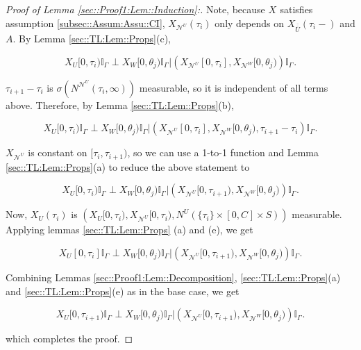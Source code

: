 \documentclass[12pt]{article}
\newcommand{\mb}{\mathbb}
\newcommand{\mc}{\mathcal}
\newcommand{\ov}{\overline}
\renewcommand{\U}{U}							%
\newcommand{\UU}{W}								%
\renewcommand{\S}{S}							%
\newcommand{\X}{X}								%
\newcommand{\neigh}{\mc{N}}						%
\newcommand{\vind}[1]{^{#1}}					%
\newcommand{\cind}[1]{_{#1}}					%
\newcommand{\cl}{\ov}							%
\newcommand{\tp}[1]{(#1)}						%
\newcommand{\tip}[1]{#1}						%
\newcommand{\const}{C}							%
\newcommand{\poiss}{N}							%
\newcommand{\indx}[1]{_{#1}}					%
\newcommand{\rt}{\tau}							%
\newcommand{\rtt}{\theta}						%
\newcommand{\apath}{\Gamma}						%
\newcommand{\rv}{A}								%
\begin{document}
\begin{proof}[Proof of Lemma \ref{sec::Proof1:Lem::Induction}:]
Note, because \(\X\cind{}\tip{}\) satisfies assumption \ref{subsec::Assum:Assu::CI}, \(\X\cind{\neigh\vind{\U}}\tp{\rt\indx{i}}\) only depends on \(\X\cind{\cl{\cl{\U}}}\tp{\rt\indx{i}-}\) and \(\rv\). By Lemma \ref{sec::TL:Lem::Props}(c), 

\[\X\cind{\U}\tip{[0,\rt\indx{i})}\mb{I}_{\apath\indx{}}\perp \X\cind{\UU}\tip{[0,\rtt\indx{j})}\mb{I}_{\apath\indx{}}|\left(\X\cind{\neigh\vind{\U}}\tip{[0,\rt\indx{i}]},\X\cind{\neigh\vind{\UU}}\tip{[0,\rtt\indx{j})}\right)\mb{I}_{\apath\indx{}}.\]

\(\rt\indx{i+1} - \rt\indx{i}\) is \(\sigma(\poiss\vind{\neigh\vind{\U}}(\rt\indx{i},\infty))\) measurable, so it is independent of all terms above. Therefore, by Lemma \ref{sec::TL:Lem::Props}(b),

\[\X\cind{\U}\tip{[0,\rt\indx{i})}\mb{I}_{\apath\indx{}}\perp \X\cind{\UU}\tip{[0,\rtt\indx{j})}\mb{I}_{\apath\indx{}}|\left(\X\cind{\neigh\vind{\U}}\tip{[0,\rt\indx{i}]},\X\cind{\neigh\vind{\UU}}\tip{[0,\rtt\indx{j})},\rt\indx{i+1} - \rt\indx{i}\right)\mb{I}_{\apath\indx{}}.\]

\(\X\cind{\neigh\vind{\U}}\tip{}\) is constant on \([\rt\indx{i},\rt\indx{i+1})\), so we can use a 1-to-1 function and Lemma \ref{sec::TL:Lem::Props}(a) to reduce the above statement to

\[\X\cind{\U}\tip{[0,\rt\indx{i})}\mb{I}_{\apath\indx{}}\perp \X\cind{\UU}\tip{[0,\rtt\indx{j})}\mb{I}_{\apath\indx{}}|\left(\X\cind{\neigh\vind{\U}}\tip{[0,\rt\indx{i+1})},\X\cind{\neigh\vind{\UU}}\tip{[0,\rtt\indx{j})}\right)\mb{I}_{\apath\indx{}}.\]

Now, \(\X\cind{\U}\tp{\rt\indx{i}}\) is \(\left(\X\cind{\U}\tip{[0,\rt\indx{i})}, \X\cind{\neigh\vind{\U}}\tip{[0,\rt\indx{i})}, \poiss\vind{\U}(\{\rt\indx{i}\}\times [0,\const\indx{}]\times\S)\right)\) measurable. Applying lemmas \ref{sec::TL:Lem::Props} (a) and (e), we get

\[\X\cind{\U}\tip{[0,\rt\indx{i}]}\mb{I}_{\apath\indx{}}\perp \X\cind{\UU}\tip{[0,\rtt\indx{j})}\mb{I}_{\apath\indx{}}|\left(\X\cind{\neigh\vind{\U}}\tip{[0,\rt\indx{i+1})},\X\cind{\neigh\vind{\UU}}\tip{[0,\rtt\indx{j})}\right)\mb{I}_{\apath\indx{}}.\]

Combining Lemmas \ref{sec::Proof1:Lem::Decomposition}, \ref{sec::TL:Lem::Props}(a) and \ref{sec::TL:Lem::Props}(e) as in the base case, we get

\[\X\cind{\U}\tip{[0,\rt\indx{i+1})}\mb{I}_{\apath\indx{}}\perp \X\cind{\UU}\tip{[0,\rtt\indx{j})}\mb{I}_{\apath\indx{}}|\left(\X\cind{\neigh\vind{\U}}\tip{[0,\rt\indx{i+1})},\X\cind{\neigh\vind{\UU}}\tip{[0,\rtt\indx{j})}\right)\mb{I}_{\apath\indx{}}.\]

which completes the proof.
\end{proof}
\end{document}
